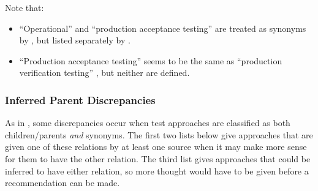       Note that:
      \begin{itemize}
            \item ``Operational'' and ``production acceptance testing'' are treated
                  as synonyms by \citetISTQB{}, but listed separately by
                  \citet[p.~30]{Firesmith2015}.
            \item ``Production acceptance testing'' \citep[p.~30]{Firesmith2015}
                  seems to be the same as ``production verification testing''
                  \citep[p.~22]{IEEE2022}, but neither are defined.
      \end{itemize}

      \subsubsection{Inferred Parent Discrepancies}
      As in , some discrepancies occur when test approaches
      are classified as both children/parents \emph{and} synonyms. The first two
      lists below give approaches that are given one of these relations by at
      least one source when it may make more sense for them to have the other
      relation. The third list gives approaches that could be inferred to have
      either relation, so more thought would have to be given before a
      recommendation can be made.

      
\fi